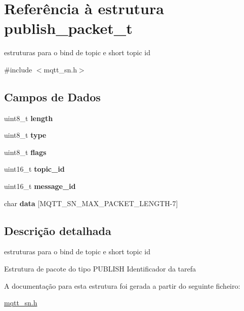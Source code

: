 \hypertarget{structpublish__packet__t}{\section{Referência à estrutura publish\+\_\+packet\+\_\+t}
\label{structpublish__packet__t}
}


estruturas para o bind de topic e short topic id  




{\ttfamily \#include $<$mqtt\+\_\+sn.\+h$>$}

\subsection*{Campos de Dados}
\begin{DoxyCompactItemize}
\item 
\hypertarget{structpublish__packet__t_ab2b3adeb2a67e656ff030b56727fd0ac}{uint8\+\_\+t {\bfseries length}}\label{structpublish__packet__t_ab2b3adeb2a67e656ff030b56727fd0ac}

\item 
\hypertarget{structpublish__packet__t_a1d127017fb298b889f4ba24752d08b8e}{uint8\+\_\+t {\bfseries type}}\label{structpublish__packet__t_a1d127017fb298b889f4ba24752d08b8e}

\item 
\hypertarget{structpublish__packet__t_aa2585d779da0ab21273a8d92de9a0ebe}{uint8\+\_\+t {\bfseries flags}}\label{structpublish__packet__t_aa2585d779da0ab21273a8d92de9a0ebe}

\item 
\hypertarget{structpublish__packet__t_ad562f54acc5597130e0710c356963dff}{uint16\+\_\+t {\bfseries topic\+\_\+id}}\label{structpublish__packet__t_ad562f54acc5597130e0710c356963dff}

\item 
\hypertarget{structpublish__packet__t_aa9c217c6e58cdb2408e2ffbe9425289d}{uint16\+\_\+t {\bfseries message\+\_\+id}}\label{structpublish__packet__t_aa9c217c6e58cdb2408e2ffbe9425289d}

\item 
\hypertarget{structpublish__packet__t_a20288f8717064f4e815c8d57b5fdec41}{char {\bfseries data} \mbox{[}M\+Q\+T\+T\+\_\+\+S\+N\+\_\+\+M\+A\+X\+\_\+\+P\+A\+C\+K\+E\+T\+\_\+\+L\+E\+N\+G\+T\+H-\/7\mbox{]}}\label{structpublish__packet__t_a20288f8717064f4e815c8d57b5fdec41}

\end{DoxyCompactItemize}


\subsection{Descrição detalhada}
estruturas para o bind de topic e short topic id 

Estrutura de pacote do tipo P\+U\+B\+L\+I\+S\+H Identificador da tarefa 

A documentação para esta estrutura foi gerada a partir do seguinte ficheiro\+:\begin{DoxyCompactItemize}
\item 
\hyperlink{mqtt__sn_8h}{mqtt\+\_\+sn.\+h}\end{DoxyCompactItemize}
